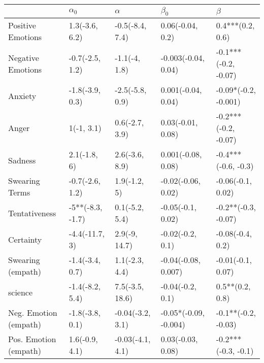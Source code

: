 \begin{tabular}{lllll}
\toprule
{} &        $\alpha_0$ &          $\alpha$ &              $\beta_0$ &               $\beta$ \\
\midrule
Positive Emotions     &    1.3(-3.6, 6.2) &   -0.5(-8.4, 7.4) &       0.06(-0.04, 0.2) &      0.4***(0.2, 0.6) \\
Negative Emotions     &   -0.7(-2.5, 1.2) &     -1.1(-4, 1.8) &    -0.003(-0.04, 0.04) &  -0.1***(-0.2, -0.07) \\
Anxiety               &   -1.8(-3.9, 0.3) &   -2.5(-5.8, 0.9) &     0.001(-0.04, 0.04) &  -0.09*(-0.2, -0.001) \\
Anger                 &        1(-1, 3.1) &    0.6(-2.7, 3.9) &      0.03(-0.01, 0.08) &  -0.2***(-0.2, -0.07) \\
Sadness               &      2.1(-1.8, 6) &    2.6(-3.6, 8.9) &     0.001(-0.08, 0.08) &   -0.4***(-0.6, -0.3) \\
Swearing Terms        &   -0.7(-2.6, 1.2) &      1.9(-1.2, 5) &     -0.02(-0.06, 0.02) &     -0.06(-0.1, 0.02) \\
Tentativeness         &  -5**(-8.3, -1.7) &    0.1(-5.2, 5.4) &      -0.05(-0.1, 0.02) &   -0.2**(-0.3, -0.07) \\
Certainty             &    -4.4(-11.7, 3) &     2.9(-9, 14.7) &       -0.02(-0.2, 0.1) &      -0.08(-0.4, 0.2) \\
Swearing (empath)     &   -1.4(-3.4, 0.7) &    1.1(-2.3, 4.4) &    -0.04(-0.08, 0.007) &     -0.01(-0.1, 0.07) \\
science               &   -1.4(-8.2, 5.4) &   7.5(-3.5, 18.6) &       -0.04(-0.2, 0.1) &       0.5**(0.2, 0.8) \\
Neg. Emotion (empath) &   -1.8(-3.8, 0.1) &  -0.04(-3.2, 3.1) &  -0.05*(-0.09, -0.004) &   -0.1**(-0.2, -0.03) \\
Pos. Emotion (empath) &    1.6(-0.9, 4.1) &  -0.03(-4.1, 4.1) &      0.03(-0.03, 0.08) &   -0.2***(-0.3, -0.1) \\
\bottomrule
\end{tabular}
